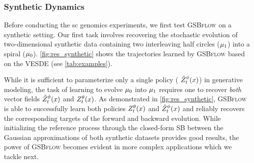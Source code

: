 \begin{table}[ht]
    \caption{Evaluation of predictive performance w.r.t. the entropy-regularized Wasserstein distance $W_\varepsilon$ \citep{cuturi2013sinkhorn} of \textsc{GSBflow} and baselines on generating different \acrlong{sc} datasets (using 3 runs).}
    \label{tab:exp_wasserstein_cells}
    \centering
{}
\end{table}

\subsubsection{Synthetic Dynamics} 
\label{sec:gsbflow_synthetic}

Before conducting the \acrlong{sc} genomics experiments, we first test \textsc{GSBflow} on a synthetic setting. 
Our first task involves recovering the stochastic evolution of two-dimensional synthetic data containing two interleaving half circles ($\mu_1$) into a spiral ($\mu_0$). 
\cref{fig:res_synthetic} shows the trajectories learned by \textsc{GSBflow} based on the \acrshort{VESDE} (see \cref{tab:examples}). 

While it is sufficient to parameterize only a single policy ({\color{blue} $\SBb$}) in generative modeling, the task of learning to evolve $\mu_0$ into $\mu_1$ requires one to recover \emph{both} vector fields {\color{blue} $\SBb$} and {\color{pink} $\SBf$}.
As demonstrated in \cref{fig:res_synthetic}, \textsc{GSBflow} is able to successfully learn both policies {\color{pink} $\SBf$} and {\color{blue} $\SBb$} and reliably recovers the corresponding targets of the forward and backward evolution. While initializing the reference process through the closed-form \acrshort{SB} between the Gaussian approximations of both synthetic datasets provides good results, the power of \textsc{GSBflow} becomes evident in more complex applications which we tackle next.

